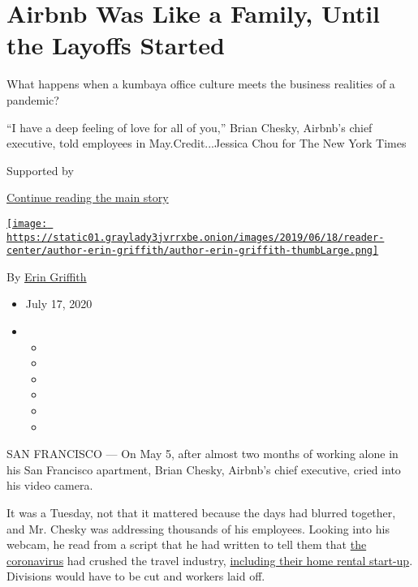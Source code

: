 \hypertarget{airbnb-was-like-a-family-until-the-layoffs-started}{%
\section{Airbnb Was Like a Family, Until the Layoffs
Started}\label{airbnb-was-like-a-family-until-the-layoffs-started}}

What happens when a kumbaya office culture meets the business realities
of a pandemic?

``I have a deep feeling of love for all of you,'' Brian Chesky, Airbnb's
chief executive, told employees in May.Credit...Jessica Chou for The New
York Times

Supported by

\protect\hyperlink{after-sponsor}{Continue reading the main story}

\href{https://www.nytimes3xbfgragh.onion/by/erin-griffith}{\texttt{[image: https://static01.graylady3jvrrxbe.onion/images/2019/06/18/reader-center/author-erin-griffith/author-erin-griffith-thumbLarge.png]}}

By \href{https://www.nytimes3xbfgragh.onion/by/erin-griffith}{Erin
Griffith}

\begin{itemize}
\item
  July 17, 2020
\item
  \begin{itemize}
  \item
  \item
  \item
  \item
  \item
  \item
  \end{itemize}
\end{itemize}

SAN FRANCISCO --- On May 5, after almost two months of working alone in
his San Francisco apartment, Brian Chesky, Airbnb's chief executive,
cried into his video camera.

It was a Tuesday, not that it mattered because the days had blurred
together, and Mr. Chesky was addressing thousands of his employees.
Looking into his webcam, he read from a script that he had written to
tell them that
\href{https://www.nytimes3xbfgragh.onion/news-event/coronavirus?action=click\&pgtype=Article\&state=default\&module=styln-coronavirus\&variant=show\&region=TOP_BANNER\&context=storylines_menu}{the
coronavirus} had crushed the travel industry,
\href{https://www.nytimes3xbfgragh.onion/2020/03/10/technology/airbnb-hosts-coronavirus.html}{including
their home rental start-up}. Divisions would have to be cut and workers
laid off.


